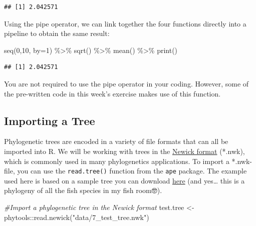 \documentclass[
]{book}
\newenvironment{Shaded}{\begin{snugshade}}{\end{snugshade}}
\newcommand{\AttributeTok}[1]{\textcolor[rgb]{0.77,0.63,0.00}{#1}}
\newcommand{\CommentTok}[1]{\textcolor[rgb]{0.56,0.35,0.01}{\textit{#1}}}
\newcommand{\DecValTok}[1]{\textcolor[rgb]{0.00,0.00,0.81}{#1}}
\newcommand{\FunctionTok}[1]{\textcolor[rgb]{0.00,0.00,0.00}{#1}}
\newcommand{\NormalTok}[1]{#1}
\newcommand{\OtherTok}[1]{\textcolor[rgb]{0.56,0.35,0.01}{#1}}
\newcommand{\SpecialCharTok}[1]{\textcolor[rgb]{0.00,0.00,0.00}{#1}}
\newcommand{\StringTok}[1]{\textcolor[rgb]{0.31,0.60,0.02}{#1}}
\begin{document}
\begin{verbatim}
## [1] 2.042571
\end{verbatim}

Using the pipe operator, we can link together the four functions directly into a pipeline to obtain the same result:

\begin{Shaded}
\begin{Highlighting}[]
\FunctionTok{seq}\NormalTok{(}\DecValTok{0}\NormalTok{,}\DecValTok{10}\NormalTok{, }\AttributeTok{by=}\DecValTok{1}\NormalTok{) }\SpecialCharTok{\%\textgreater{}\%} \FunctionTok{sqrt}\NormalTok{() }\SpecialCharTok{\%\textgreater{}\%} \FunctionTok{mean}\NormalTok{() }\SpecialCharTok{\%\textgreater{}\%} \FunctionTok{print}\NormalTok{()}
\end{Highlighting}
\end{Shaded}

\begin{verbatim}
## [1] 2.042571
\end{verbatim}

You are not required to use the pipe operator in your coding. However, some of the pre-written code in this week's exercise makes use of this function.

\hypertarget{importing-a-tree}{%
\subsection{Importing a Tree}\label{importing-a-tree}}

Phylogenetic trees are encoded in a variety of file formats that can all be imported into R. We will be working with trees in the \href{https://en.wikipedia.org/wiki/Newick_format}{Newick format} (*.nwk), which is commonly used in many phylogenetics applications. To import a *.nwk-file, you can use the \texttt{read.tree()} function from the \texttt{ape} package. The example used here is based on a sample tree you can download \href{data/7_test_tree.nwk}{here} (and yes\ldots{} this is a phylogeny of all the fish species in my fish room🤓).

\begin{Shaded}
\begin{Highlighting}[]
\CommentTok{\#Import a phylogenetic tree in the Newick format}
\NormalTok{test.tree }\OtherTok{\textless{}{-}}\NormalTok{ phytools}\SpecialCharTok{::}\FunctionTok{read.newick}\NormalTok{(}\StringTok{"data/7\_test\_tree.nwk"}\NormalTok{)}
\end{Highlighting}
\end{Shaded}
\end{document}
